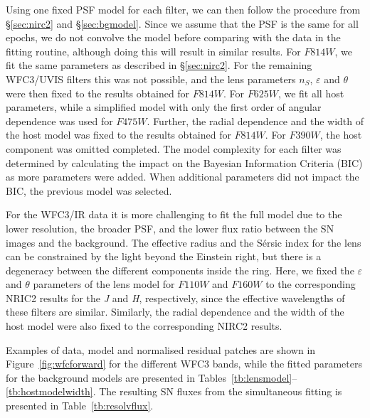 \documentclass[a4paper,fleqn,usenatbib]{mnras}
\newcommand{\sn}{SN\xspace}
\newcommand{\wfc}{WFC3\xspace}
\newcommand{\wfcuvis}{WFC3/UVIS\xspace}
\newcommand{\wfcir}{WFC3/IR\xspace}
\newcommand{\jband}{{\it J}\xspace}
\newcommand{\hband}{{\it H}\xspace}
\newcommand{\hstu}{$F390W$\xspace}
\newcommand{\hstb}{$F475W$\xspace}
\newcommand{\hstr}{$F625W$\xspace}
\newcommand{\hsti}{$F814W$\xspace}
\newcommand{\hstj}{$F110W$\xspace}
\newcommand{\hsth}{$F160W$\xspace}
\begin{document}
Using one fixed PSF model for each filter, we can then follow the procedure from \S\ref{sec:nirc2} and \S\ref{sec:bgmodel}.  Since 
we assume that the PSF is the same for all epochs, we do not convolve the model before comparing with the data in the 
fitting routine, although doing this will result in similar results.  For \hsti, we fit the same parameters as described in \S\ref{sec:nirc2}.
For the remaining \wfcuvis filters this was not possible, and the lens parameters $n_S$, $\varepsilon$ and $\theta$ were then fixed to the
results obtained for \hsti.  For \hstr, we fit all host parameters, while a simplified model with only the first order of angular dependence 
was used for \hstb.  Further, the radial dependence and the width of the host model was fixed to the results obtained for \hsti.  
For \hstu, the host component was omitted completed.  The model complexity for each filter was determined by calculating the 
impact on the Bayesian Information Criteria (BIC) as more parameters were added.  When additional parameters did not impact the BIC,
the previous model was selected.

For the \wfcir data it is more challenging to fit the full model due to the lower resolution, the broader PSF, and the lower flux ratio 
between the \sn images and the background.   The effective radius and the S\'ersic index for the lens can be constrained by the 
light beyond the Einstein right, but there is a degeneracy between the different components inside the ring.  Here, we fixed the 
$\varepsilon$ and $\theta$ parameters of the lens model for \hstj and \hsth to the corresponding NRIC2 results for the 
\jband and \hband, respectively, since the effective wavelengths of these filters are similar.  Similarly, the radial dependence and the width
of the host model were also fixed to the corresponding NIRC2 results.

Examples of data, model and normalised residual patches are shown in Figure~\ref{fig:wfcforward} for the different \wfc bands, while 
the fitted parameters for the background models are presented in Tables~\ref{tb:lensmodel}--\ref{tb:hostmodelwidth}.  
The resulting \sn fluxes from the simultaneous fitting is presented in Table~\ref{tb:resolvflux}.
\end{document}
